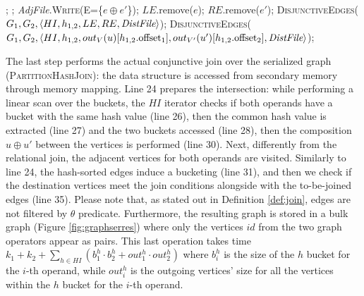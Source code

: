 \begin{algorithm}[!b]
\begin{adjustbox}{max width=\textwidth}
\begin{minipage}{1.2\linewidth}
\begin{algorithmic}[1]
					\label{line:asoldconhj}
					;
					;
					\State \textit{AdjFile}.\textsc{Write}(E=\{$e\oplus e'$\}); $LE$.remove($e$); $RE$.remove($e'$);
					\EndIf
					\EndFor
					 \textsc{DisjunctiveEdges}($G_1,G_2,\Braket{HI,h_{1,2},LE,RE,\textit{DistFile}}$);\label{line:discardedconjunctive} \EndIf
					\State \textsc{DisjunctiveEdges}($G_1,G_2,\Braket{HI,h_{1,2}, out_{V}(u)[h_{1,2}.\textup{offset}_1],out_{V'}(u')[h_{1,2}.\textup{offset}_2],\textit{DistFile}}$);\label{line:truedisjunctive}
					\EndIf
				\EndFor
				\EndIf
				\EndFor
				\EndWhile
				\EndProcedure
			\end{algorithmic}
	\end{minipage}
	\end{adjustbox}
\end{algorithm}


The last step performs the actual conjunctive join over the serialized graph (\textsc{PartitionHash\-Join}):
the data structure is accessed from secondary memory through memory mapping. Line 24  prepares the intersection: while performing a linear scan over
the buckets, the $HI$ iterator checks if both operands have a bucket with the same hash value
(line 26), then the common hash value is extracted (line 27) and the two buckets accessed
(line 28), then the {{composition}} $u\oplus u'$ between the vertices is performed (line 30). Next, differently from the
relational join,
the adjacent vertices for both operands are visited. Similarly to line 24, the hash-sorted edges induce a bucketing (line 31), and then we check if the destination vertices meet the join conditions alongside
with the to-be-joined edges (line 35). Please note that, as stated out in Definition \ref{def:join},
edges are not filtered by $\theta$ predicate.
Furthermore, the resulting graph is stored in a bulk
graph (Figure \vref{fig:graphserres}) where only the vertices $id$ from the two graph operators appear as pairs.
This last operation takes time $k_1+k_2+\sum_{h\in HI}\left( b_1^h\cdot b_2^h+out_1^h\cdot out_2^h\right)$ where $b_i^h$ is the size of the $h$ bucket for the $i$-th operand,
while $out_i^h$ is the outgoing vertices' size for all the vertices within the $h$
bucket for the $i$-th operand.


